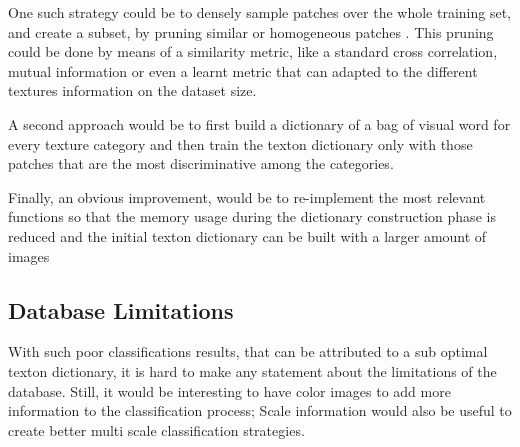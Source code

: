 \documentclass[10pt,twocolumn,letterpaper]{article}
\begin{document}
One such strategy could be to densely sample patches over the whole training set, and create a subset,  by pruning similar or homogeneous patches . This pruning could be done by means of a similarity  metric, like a standard cross correlation, mutual information or even a learnt metric that can adapted to the different textures information on the dataset size.

A second approach  would be to first build a dictionary of a bag of visual word  for  every texture category and then train the texton dictionary only with those patches that are the most discriminative among the categories.

Finally, an obvious improvement, would be to re-implement the most relevant functions so that the memory usage during the dictionary construction phase is reduced and the initial texton dictionary can be built with a larger amount of images

\subsection{Database Limitations}
With such poor classifications results, that can be attributed to a sub optimal texton dictionary, it is hard to make any statement about the limitations of the database. Still, it would be interesting to have color images to add more information to the classification process; Scale information would also be useful to create better multi scale classification strategies.



{\small


}
\end{document}
